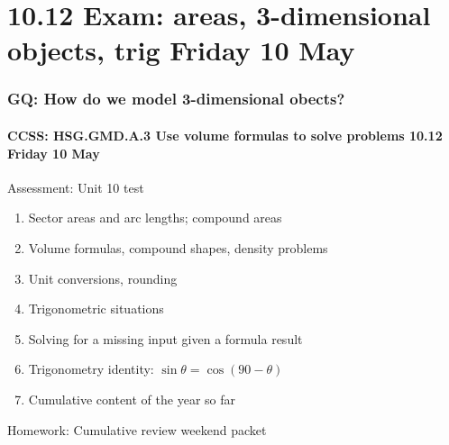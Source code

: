 \documentclass{beamer}
\begin{document}
  \section{10.12 Exam: areas, 3-dimensional objects, trig Friday 10 May}
    \frame
    {
      \frametitle{GQ: How do we model 3-dimensional obects?}
      \framesubtitle{CCSS: HSG.GMD.A.3 Use volume formulas to solve problems \hfill \alert{10.12 Friday 10 May}}

      \begin{block}{Assessment: Unit 10 test}
        \begin{enumerate}
          \item Sector areas and arc lengths; compound areas
          \item Volume formulas, compound shapes, density problems
          \item Unit conversions, rounding
          \item Trigonometric situations
          \item Solving for a missing input given a formula result
          \item Trigonometry identity: $\sin \theta = \cos (90-\theta)$
          \item Cumulative content of the year so far
      \end{enumerate}
      \end{block}
      Homework: Cumulative review weekend packet
    }
\end{document}
